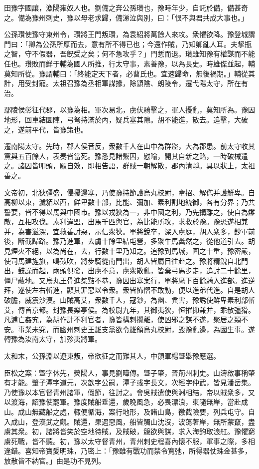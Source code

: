 
\begin{pinyinscope}
田豫字國讓，漁陽雍奴人也。劉備之奔公孫瓚也，豫時年少，自託於備，備甚奇之。備為豫州刺史，豫以母老求歸，備涕泣與別，曰：「恨不與君共成大事也。」

公孫瓚使豫守東州令，瓚將王門叛瓚，為袁紹將萬餘人來攻。衆懼欲降。豫登城謂門曰：「卿為公孫所厚而去，意有所不得已也；今還作賊，乃知卿亂人耳。夫挈瓶之智，守不假器，吾旣受之矣；何不急攻乎？」門慙而退。瓚雖知豫有權謀而不能任也。瓚敗而鮮于輔為國人所推，行太守事，素善豫，以為長史。時雄傑並起，輔莫知所從。豫謂輔曰：「終能定天下者，必曹氏也。宜速歸命，無後禍期。」輔從其計，用受封寵。太祖召豫為丞相軍謀掾，除頴陰、朗陵令，遷弋陽太守，所在有治。

鄢陵侯彰征代郡，以豫為相。軍次易北，虜伏騎擊之，軍人擾亂，莫知所為。豫因地形，回車結圜陣，弓弩持滿於內，疑兵塞其隙。胡不能進，散去。追擊，大破之，遂前平代，皆豫策也。

遷南陽太守。先時，郡人侯音反，衆數千人在山中為群盜，大為郡患。前太守收其黨與五百餘人，表奏皆當死。豫悉見諸繫囚，慰喻，開其自新之路，一時破械遣之。諸囚皆叩頭，願自效，即相告語，群賊一朝解散，郡內清靜。具以狀上，太祖善之。

文帝初，北狄彊盛，侵擾邊塞，乃使豫持節護烏丸校尉，牽招、解儁并護鮮卑。自高柳以東，濊貊以西，鮮卑數十部，比能、彌加、素利割地統御，各有分界；乃共誓要，皆不得以馬與中國市。豫以戎狄為一，非中國之利，乃先搆離之，使自為讎敵，互相攻伐。素利違盟，出馬千匹與官，為比能所攻，求救於豫。豫恐遂相兼并，為害滋深，宜救善討惡，示信衆狄。單將銳卒，深入虜庭，胡人衆多，鈔軍前後，斷截歸路。豫乃進軍，去虜十餘里結屯營，多聚牛馬糞然之，從他道引去。胡見煙火不絕，以為尚在，去，行數十里乃知之。追豫到馬城，圍之十重，豫密嚴，使司馬建旌旗，鳴鼓吹，將步騎從南門出，胡人皆屬目往赴之。豫將精銳自北門出，鼓譟而起，兩頭俱發，出虜不意，虜衆散亂，皆棄弓馬步走，追討二十餘里，僵尸蔽地。又烏丸王骨進桀黠不恭，豫因出塞案行，單將麾下百餘騎入進部。進逆拜，遂使左右斬進，顯其罪惡以令衆。衆皆怖慴不敢動，便以進弟代進。自是胡人破膽，威震沙漠。山賊高艾，衆數千人，寇鈔，為幽、兾害，豫誘使鮮卑素利部斬艾，傳首京都。封豫長樂亭侯。為校尉九年，其御夷狄，恒摧抑兼并，乖散彊猾。凡逋亡姦宄，為胡作計不利官者，豫皆構刺攪離，使凶邪之謀不遂，聚居之類不安。事業未究，而幽州刺史王雄支黨欲令雄領烏丸校尉，毀豫亂邊，為國生事。遂轉豫為汝南太守，加殄夷將軍。

太和末，公孫淵以遼東叛，帝欲征之而難其人，中領軍楊曁舉豫應選。

臣松之案：曁字休先，熒陽人，事見劉曄傳。曁子肇，晉荊州刺史。山濤啟事稱肇有才能。肇子潭字道元，次歆字公嗣，潭子彧字長文，次經字仲武，皆見潘岳集。乃使豫以本官督青州諸軍，假節，往討之。會吳賊遣使與淵相結，帝以賊衆多，又以渡海，詔豫使罷軍。豫度賊船垂還，歲晚風急，必畏漂浪，東隨無岸，當赴成山。成山無藏船之處，輙便循海，案行地形，及諸山島，徼截險要，列兵屯守。自入成山，登漢武之觀。賊還，果遇惡風，船皆觸山沈沒，波蕩著岸，無所蒙竄，盡虜其衆。初，諸將皆笑於空地待賊，及賊破，競欲與謀，求入海鉤取浪舡。豫懼窮虜死戰，皆不聽。初，豫以太守督青州，青州刺史程喜內懷不服，軍事之際，多相違錯。喜知帝寶愛明珠，乃密上：「豫雖有戰功而禁令寬弛，所得器仗珠金甚多，放散皆不納官。」由是功不見列。


\end{pinyinscope}
